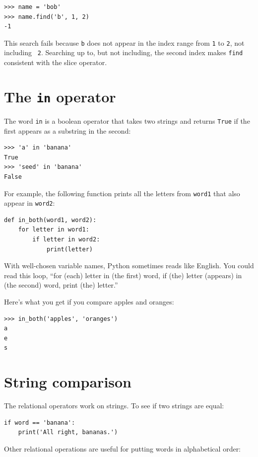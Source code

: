 \documentclass[10pt]{book}
\begin{document}
\begin{verbatim}
>>> name = 'bob'
>>> name.find('b', 1, 2)
-1
\end{verbatim}
%
This search fails because {\tt b} does not
appear in the index range from {\tt 1} to {\tt 2}, not including {\tt
2}.  Searching up to, but not including, the second index makes
{\tt find} consistent with the slice operator.



\section{The {\tt in} operator}
\label{inboth}

The word {\tt in} is a boolean operator that takes two strings and
returns {\tt True} if the first appears as a substring in the second:

\begin{verbatim}
>>> 'a' in 'banana'
True
>>> 'seed' in 'banana'
False
\end{verbatim}
%
For example, the following function prints all the
letters from {\tt word1} that also appear in {\tt word2}:

\begin{verbatim}
def in_both(word1, word2):
    for letter in word1:
        if letter in word2:
            print(letter)
\end{verbatim}
%
With well-chosen variable names,
Python sometimes reads like English.  You could read
this loop, ``for (each) letter in (the first) word, if (the) letter
(appears) in (the second) word, print (the) letter.''

Here's what you get if you compare apples and oranges:

\begin{verbatim}
>>> in_both('apples', 'oranges')
a
e
s
\end{verbatim}
%

\section{String comparison}

The relational operators work on strings.  To see if two strings are equal:

\begin{verbatim}
if word == 'banana':
    print('All right, bananas.')
\end{verbatim}
%
Other relational operations are useful for putting words in alphabetical
order:
\end{document}

